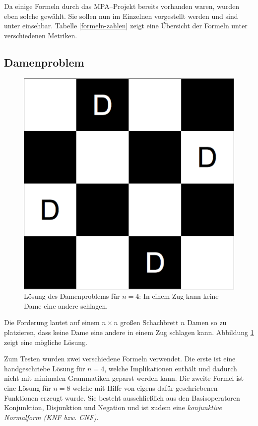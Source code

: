 \documentclass[ngerman,a4paper,abstracton,open=right,twoside=false,toc=listofnumbered,bibtotocnumbered]{scrreprt}
\begin{document}
Da einige Formeln durch das MPA--Projekt bereits vorhanden waren, wurden eben solche gewählt. Sie sollen nun im Einzelnen vorgestellt werden und sind unter \cite{lw-formeln} einsehbar. Tabelle \ref{formeln-zahlen} zeigt eine Übersicht der Formeln unter verschiedenen Metriken.

\subsection{Damenproblem}

\begin{figure}[ht]
	\begin{center}
		\includegraphics[scale=0.5]{img/four-queens}
	\end{center}
	\caption{\label{four-queens} Lösung des Damenproblems für $n = 4$: In einem Zug kann keine Dame eine andere schlagen.}
\end{figure}

Die Forderung lautet auf einem $n \times n$ großen Schachbrett $n$ Damen so zu platzieren, dass keine Dame eine andere in einem Zug schlagen kann. Abbildung \ref{four-queens} zeigt eine mögliche Lösung.

Zum Testen wurden zwei verschiedene Formeln verwendet. Die erste ist eine handgeschriebe Lösung für $n = 4$, welche Implikationen enthält und dadurch nicht mit minimalen Grammatiken geparst werden kann. Die zweite Formel ist eine Lösung für $n = 8$ welche mit Hilfe von eigens dafür geschriebenen Funktionen erzeugt wurde. Sie besteht ausschließlich aus den Basisoperatoren Konjunktion, Disjunktion und Negation und ist zudem eine \emph{konjunktive Normalform (KNF bzw. CNF)}.
\end{document}
